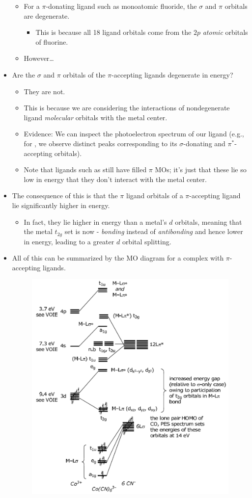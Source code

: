 \documentclass[../notes.tex]{subfiles}
\begin{document}
\begin{itemize}
\begin{itemize}
        \item For a $\pi$-donating ligand such as monoatomic fluoride, the $\sigma$ and $\pi$ orbitals are degenerate.
        \begin{itemize}
            \item This is because all 18 ligand orbitals come from the $2p$ \emph{atomic} orbitals of fluorine.
        \end{itemize}
        \item However\dots
    \end{itemize}
    \item Are the $\sigma$ and $\pi$ orbitals of the $\pi$-accepting ligands degenerate in energy?
    \begin{itemize}
        \item They are not.
        \item This is because we are considering the interactions of nondegenerate ligand \emph{molecular} orbitals with the metal center.
        \item Evidence: We can inspect the photoelectron spectrum of our ligand (e.g., for , we observe distinct peaks corresponding to its $\sigma$-donating and $\pi^*$-accepting orbitals).
        \item Note that ligands such as  still have filled $\pi$ MOs; it's just that these lie so low in energy that they don't interact with the metal center.
    \end{itemize}
    \item The consequence of this is that the $\pi$ ligand orbitals of a $\pi$-accepting ligand lie significantly higher in energy.
    \begin{itemize}
        \item In fact, they lie higher in energy than a metal's $d$ orbitals, meaning that the metal $t_{2g}$ set is now - \emph{bonding} instead of \emph{antibonding} and hence lower in energy, leading to a greater $d$ orbital splitting.
    \end{itemize}
    \item All of this can be summarized by the MO diagram for a  complex with $\pi$-accepting ligands.
    \begin{figure}[h!]
        \centering
        \includegraphics[width=0.6\linewidth]{../ExtFiles/MOsML6piAcc.png}

\end{figure}
\end{itemize}
\end{document}

